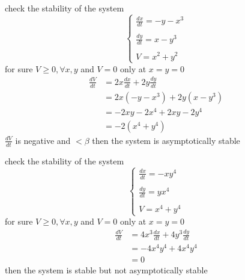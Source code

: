 \documentclass[]{article}
\begin{document}
\begin{example}
    check the stability of the system   
    \begin{equation*}
        \begin{cases}
            \displaystyle \frac{dx}{dt} = -y -x^3
            \\\\
            \displaystyle \frac{dy}{dt} = x -y^3
            \\\\
            \displaystyle V = x^2 + y^2
        \end{cases}
    \end{equation*} 
    for sure $V \geq 0 , \forall x,y$ and $V = 0$ only at $x=y=0 $
    \begin{align*}
        \frac{dV}{dt} &= 2x \frac{dx}{dt} + 2y \frac{dy}{dt}
    \\
    &= 2x (-y -x^3) + 2y(x -y^3)
    \\
    &= -2xy -2x^4 +2xy -2y^4
    \\
    &= -2 (x^4 + y^4)
    \end{align*}
    $\displaystyle \frac{dV}{dt}$ is negative and $< \beta $ then the system is asymptotically stable 
\end{example}
\begin{example}
    check the stability of the system   
\begin{equation*}
    \begin{cases}
        \displaystyle \frac{dx}{dt} = -xy^4
        \\\\
        \displaystyle \frac{dy}{dt} = yx^4
        \\\\
        \displaystyle V = x^4 + y^4
    \end{cases}
\end{equation*}
for sure $V \geq 0 , \forall x,y$ and $V = 0$ only at $x=y=0 $
\begin{align*}
    \frac{dV}{dt} &= 4x^3 \frac{dx}{dt} + 4y^3 \frac{dy}{dt}
\\
&= -4x^4y^4 + 4x^4y^4
\\ 
&= 0
\end{align*}
then the system is stable but not asymptotically stable
\end{example} 
\end{document}
